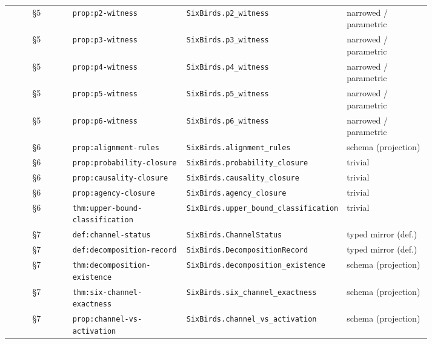 \documentclass[11pt]{article}
\theoremstyle{definition}
\begin{document}
{\begin{longtable}{@{}c >{\raggedright\arraybackslash}p{0.27\linewidth} >{\raggedright\arraybackslash}p{0.34\linewidth} >{\raggedright\arraybackslash}p{0.20\linewidth}@{}}
§5 & \texttt{prop:\allowbreak p2-\allowbreak witness} & \texttt{SixBirds.\allowbreak p2\_\allowbreak witness} & narrowed / parametric \\
§5 & \texttt{prop:\allowbreak p3-\allowbreak witness} & \texttt{SixBirds.\allowbreak p3\_\allowbreak witness} & narrowed / parametric \\
§5 & \texttt{prop:\allowbreak p4-\allowbreak witness} & \texttt{SixBirds.\allowbreak p4\_\allowbreak witness} & narrowed / parametric \\
§5 & \texttt{prop:\allowbreak p5-\allowbreak witness} & \texttt{SixBirds.\allowbreak p5\_\allowbreak witness} & narrowed / parametric \\
§5 & \texttt{prop:\allowbreak p6-\allowbreak witness} & \texttt{SixBirds.\allowbreak p6\_\allowbreak witness} & narrowed / parametric \\
§6 & \texttt{prop:\allowbreak alignment-\allowbreak rules} & \texttt{SixBirds.\allowbreak alignment\_\allowbreak rules} & schema (projection) \\
§6 & \texttt{prop:\allowbreak probability-\allowbreak closure} & \texttt{SixBirds.\allowbreak probability\_\allowbreak closure} & trivial \\
§6 & \texttt{prop:\allowbreak causality-\allowbreak closure} & \texttt{SixBirds.\allowbreak causality\_\allowbreak closure} & trivial \\
§6 & \texttt{prop:\allowbreak agency-\allowbreak closure} & \texttt{SixBirds.\allowbreak agency\_\allowbreak closure} & trivial \\
§6 & \texttt{thm:\allowbreak upper-\allowbreak bound-\allowbreak classification} & \texttt{SixBirds.\allowbreak upper\_\allowbreak bound\_\allowbreak classification} & trivial \\
§7 & \texttt{def:\allowbreak channel-\allowbreak status} & \texttt{SixBirds.\allowbreak ChannelStatus} & typed mirror (def.) \\
§7 & \texttt{def:\allowbreak decomposition-\allowbreak record} & \texttt{SixBirds.\allowbreak DecompositionRecord} & typed mirror (def.) \\
§7 & \texttt{thm:\allowbreak decomposition-\allowbreak existence} & \texttt{SixBirds.\allowbreak decomposition\_\allowbreak existence} & schema (projection) \\
§7 & \texttt{thm:\allowbreak six-\allowbreak channel-\allowbreak exactness} & \texttt{SixBirds.\allowbreak six\_\allowbreak channel\_\allowbreak exactness} & schema (projection) \\
§7 & \texttt{prop:\allowbreak channel-\allowbreak vs-\allowbreak activation} & \texttt{SixBirds.\allowbreak channel\_\allowbreak vs\_\allowbreak activation} & schema (projection) \\

\end{longtable}}
\end{document}
